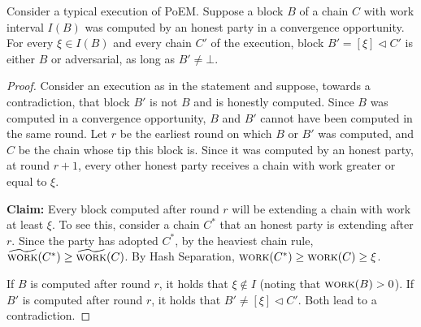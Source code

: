 \begin{lemma} \label{lem:pairing}
  Consider a typical execution of PoEM.
  Suppose a block $B$ of a chain $C$ with work interval $I(B)$
  was computed by an honest party in a convergence opportunity.
  For every $\xi \in I(B)$ and every chain $C'$ of the execution,
  block $B' = [\xi] \lhd C'$ is either $B$ or adversarial,
  as long as $B' \neq \bot$.
\end{lemma}
\begin{proof}
  Consider an execution as in the statement and suppose, towards a contradiction,
  that block $B'$ is not $B$ and is honestly computed.
  Since $B$ was computed in a convergence opportunity, $B$ and $B'$
  cannot have been computed in the same round. Let $r$ be the earliest round
  on which $B$ or $B'$ was computed, and $C$ be the chain whose tip this block is.
  Since it was computed by
  an honest party, at round $r + 1$, every other honest party receives
  a chain with work greater or equal to $\xi$.

  \textbf{Claim: } Every block computed after round $r$ will be extending a
  chain with work at least $\xi$. To see this, consider a chain $C^*$ that an honest
  party is extending after $r$. Since the party has adopted $C^*$, by the heaviest
  chain rule, $\widetilde{\textsc{work}}(C^*) \geq \widetilde{\textsc{work}}(C)$. By Hash Separation, $\textsc{work}(C^*) \geq \textsc{work}(C) \geq \xi$.

  If $B$ is computed after round $r$, it holds that $\xi \not \in I$ (noting that $\textsc{work}(B) > 0$).
  If $B'$ is computed after round $r$, it holds that $B' \neq [\xi] \lhd C'$.
  Both lead to a contradiction. \Qed
\end{proof}

%

